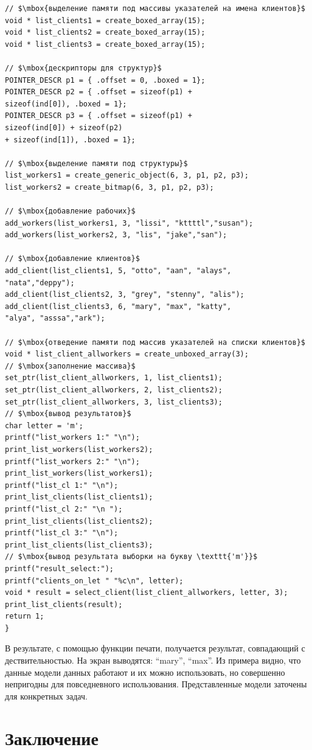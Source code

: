 \begin{lstlisting}[mathescape]
// $\mbox{выделение памяти под массивы указателей на имена клиентов}$
void * list_clients1 = create_boxed_array(15);  
void * list_clients2 = create_boxed_array(15);
void * list_clients3 = create_boxed_array(15);

// $\mbox{дескрипторы для структур}$
POINTER_DESCR p1 = { .offset = 0, .boxed = 1};
POINTER_DESCR p2 = { .offset = sizeof(p1) + 
sizeof(ind[0]), .boxed = 1};
POINTER_DESCR p3 = { .offset = sizeof(p1) + 
sizeof(ind[0]) + sizeof(p2)
+ sizeof(ind[1]), .boxed = 1};

// $\mbox{выделение памяти под структуры}$
list_workers1 = create_generic_object(6, 3, p1, p2, p3);
list_workers2 = create_bitmap(6, 3, p1, p2, p3);

// $\mbox{добавление рабочих}$
add_workers(list_workers1, 3, "lissi", "kttttl","susan");
add_workers(list_workers2, 3, "lis", "jake","san");

// $\mbox{добавление клиентов}$
add_client(list_clients1, 5, "otto", "aan", "alays",
"nata","deppy");
add_client(list_clients2, 3, "grey", "stenny", "alis");
add_client(list_clients3, 6, "mary", "max", "katty",
"alya", "asssa","ark");

// $\mbox{отведение памяти под массив указателей на списки клиентов}$
void * list_client_allworkers = create_unboxed_array(3);
// $\mbox{заполнение массива}$
set_ptr(list_client_allworkers, 1, list_clients1);
set_ptr(list_client_allworkers, 2, list_clients2);
set_ptr(list_client_allworkers, 3, list_clients3);
// $\mbox{вывод результатов}$
char letter = 'm';
printf("list_workers 1:" "\n");
print_list_workers(list_workers2);
printf("list_workers 2:" "\n");
print_list_workers(list_workers1);
printf("list_cl 1:" "\n");
print_list_clients(list_clients1);
printf("list_cl 2:" "\n ");
print_list_clients(list_clients2);
printf("list_cl 3:" "\n");
print_list_clients(list_clients3);
// $\mbox{вывод результата выборки на букву \texttt{'m'}}$
printf("result_select:");
printf("clients_on_let " "%c\n", letter);
void * result = select_client(list_client_allworkers, letter, 3);
print_list_clients(result);
return 1;
}
\end{lstlisting}

В результате, с помощью функции печати, получается результат, совпадающий с дествительностью. На экран выводятся: ``mary'', ``max''.
Из примера видно, что данные модели данных  работают и их можно использовать, но  совершенно непригодны для повседневного использования. Представленные модели заточены для конкретных задач.

\section*{Заключение}

